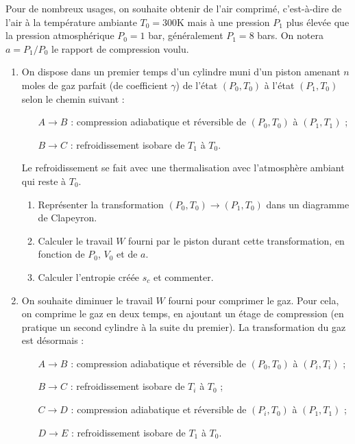 Pour de nombreux usages, on souhaite obtenir de l'air comprimé, c'est-à-dire de l'air à la température ambiante $T_0=300$K mais à une pression $P_1$ plus élevée que la pression atmosphérique $P_0=1$ bar, généralement $P_1=8$ bars. On notera $a=P_1/P_0$ le rapport de compression voulu.

\begin{enumerate}

\item On dispose dans un premier temps d'un cylindre muni d'un piston amenant $n$ moles de gaz parfait  (de coefficient $\gamma$) de l'état $(P_0, T_0)$ à l'état $(P_1, T_0)$ selon le chemin suivant :
\begin{itemize}

	\item[$A\rightarrow B$ :] compression adiabatique et réversible de $(P_0, T_0)$ à $(P_1, T_1)$ ;
	\item[$B\rightarrow C$ :] refroidissement isobare de $T_1$ à $T_0$.
	
\end{itemize}

Le refroidissement se fait avec une thermalisation avec l'atmosphère ambiant qui reste à $T_0$.

\begin{enumerate}

\item Représenter la transformation $(P_0, T_0)\rightarrow (P_1, T_0)$ dans un diagramme de Clapeyron.
\item Calculer le travail $W$ fourni par le piston durant cette transformation, en fonction de $P_0$, $V_0$ et de $a$. 
\item Calculer l'entropie créée $s_c$ et commenter.

\end{enumerate}

\item On souhaite diminuer le travail $W$ fourni pour comprimer le gaz. Pour cela, on comprime le gaz en deux temps, en ajoutant un étage de compression (en pratique un second cylindre à la suite du premier). La transformation du gaz est désormais :
\begin{itemize}

	\item[$A\rightarrow B$ :] compression adiabatique et réversible de $(P_0, T_0)$ à $(P_i, T_i)$ ;
	\item[$B\rightarrow C$ :] refroidissement isobare de $T_i$ à $T_0$ ;
	\item[$C\rightarrow D$ :] compression adiabatique et réversible de $(P_i, T_0)$ à $(P_1, T_1)$ ;
	\item[$D\rightarrow E$ :] refroidissement isobare de $T_1$ à $T_0$.
	

\end{itemize}
\end{enumerate}
